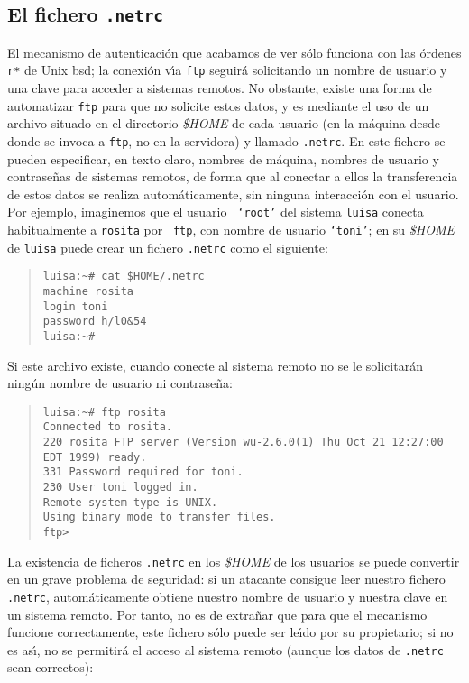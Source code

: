 \subsection{El fichero {\tt .netrc}}
El mecanismo de autenticaci\'on que acabamos de ver s\'olo funciona con las
\'ordenes {\tt r*} de Unix {\sc bsd}; la conexi\'on v\'{\i}a {\tt ftp} 
seguir\'a solicitando un nombre de usuario y una clave para acceder a sistemas
remotos. No obstante, existe una forma de automatizar {\tt ftp} para que no
solicite estos datos, y es mediante el uso de un archivo situado en el 
directorio {\it \$HOME} de cada usuario (en la m\'aquina desde donde se invoca a
{\tt ftp}, no en la servidora) y llamado {\tt .netrc}. En este fichero
se pueden especificar, en texto claro, nombres de m\'aquina, nombres de usuario
y contrase\~nas de sistemas remotos, de forma que al conectar a ellos la
transferencia de estos datos se realiza autom\'aticamente, sin ninguna 
interacci\'on con el usuario. Por ejemplo, imaginemos que el usuario {\tt 
`root'} del sistema {\tt luisa} conecta habitualmente a {\tt rosita} por {\tt 
ftp}, con nombre de usuario {\tt `toni'}; en su {\it \$HOME} de {\tt luisa}
puede crear un fichero {\tt .netrc} como el siguiente:
\begin{quote}
\begin{verbatim}
luisa:~# cat $HOME/.netrc
machine rosita
login toni
password h/l0&54
luisa:~#
\end{verbatim}
\end{quote}
Si este archivo existe, cuando conecte al sistema remoto no se le solicitar\'an
ning\'un nombre de usuario ni contrase\~na:
\begin{quote}
\begin{verbatim}
luisa:~# ftp rosita
Connected to rosita.
220 rosita FTP server (Version wu-2.6.0(1) Thu Oct 21 12:27:00 EDT 1999) ready.
331 Password required for toni.
230 User toni logged in.
Remote system type is UNIX.
Using binary mode to transfer files.
ftp>
\end{verbatim}
\end{quote}
La existencia de ficheros {\tt .netrc} en los {\it \$HOME} de los usuarios 
se puede convertir en un grave problema de seguridad: si un atacante 
consigue leer nuestro fichero {\tt .netrc}, autom\'aticamente obtiene nuestro
nombre de usuario y nuestra clave en un sistema remoto. Por tanto, no es de
extra\~nar que para que el mecanismo funcione correctamente, este fichero s\'olo
puede ser le\'{\i}do por su propietario; si no es as\'{\i}, no se permitir\'a
el acceso al sistema remoto (aunque los datos de {\tt .netrc} sean correctos):
